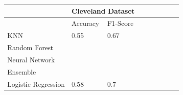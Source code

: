 \documentclass[letterpaper]{article}
\begin{document}
\begin{table}[]
	\centering
	\begin{tabular}{|l|ll|ll|ll|ll|}
		\hline
		                    & \multicolumn{2}{l|}{Cleveland Dataset}            \\ \hline
		                    & \multicolumn{1}{l|}{Accuracy}          & F1-Score \\ \hline
		KNN                 & \multicolumn{1}{l|}{0.55}              & 0.67     \\ \hline
		Random Forest       & \multicolumn{1}{l|}{}                  &          \\ \hline
		Neural Network      & \multicolumn{1}{l|}{}                  &          \\ \hline
		Ensemble            & \multicolumn{1}{l|}{}                  &          \\ \hline
		Logistic Regression & \multicolumn{1}{l|}{0.58}              & 0.7      \\ \hline
	\end{tabular}
\end{table}
\end{document}
